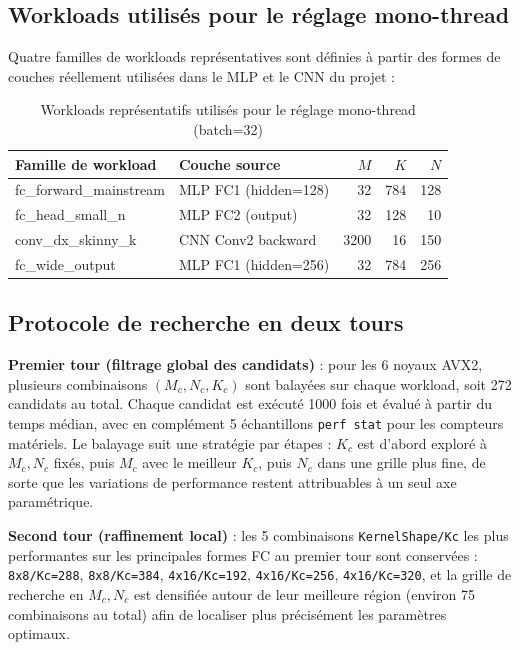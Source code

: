 \documentclass[a4paper,11pt,oneside]{article}
\begin{document}
\subsection{Workloads utilisés pour le réglage mono-thread}

Quatre familles de workloads représentatives sont définies à partir des formes de couches réellement utilisées dans le MLP et le CNN du projet :

\begin{table}[H]
\centering
\begin{tabular}{llrrr}
\toprule
\textbf{Famille de workload} & \textbf{Couche source} & $M$ & $K$ & $N$ \\
\midrule
fc\_forward\_mainstream & MLP FC1 (hidden=128) & 32 & 784 & 128 \\
fc\_head\_small\_n      & MLP FC2 (output)      & 32 & 128 & 10  \\
conv\_dx\_skinny\_k     & CNN Conv2 backward     & 3200 & 16 & 150 \\
fc\_wide\_output        & MLP FC1 (hidden=256)  & 32 & 784 & 256 \\
\bottomrule
\end{tabular}
\caption{Workloads représentatifs utilisés pour le réglage mono-thread (batch=32)}
\label{tab:tuning_workloads}
\end{table}

\subsection{Protocole de recherche en deux tours}

\textbf{Premier tour (filtrage global des candidats)} :
pour les 6 noyaux AVX2, plusieurs combinaisons $(M_c, N_c, K_c)$ sont balayées sur chaque workload, soit 272 candidats au total.
Chaque candidat est exécuté 1000 fois et évalué à partir du temps médian, avec en complément 5 échantillons \texttt{perf stat} pour les compteurs matériels.
Le balayage suit une stratégie par étapes : $K_c$ est d'abord exploré à $M_c, N_c$ fixés, puis $M_c$ avec le meilleur $K_c$, puis $N_c$ dans une grille plus fine,
de sorte que les variations de performance restent attribuables à un seul axe paramétrique.

\textbf{Second tour (raffinement local)} :
les 5 combinaisons \texttt{KernelShape/Kc} les plus performantes sur les principales formes FC au premier tour sont conservées :
\texttt{8x8/Kc=288}, \texttt{8x8/Kc=384}, \texttt{4x16/Kc=192},
\texttt{4x16/Kc=256}, \texttt{4x16/Kc=320},
et la grille de recherche en $M_c, N_c$ est densifiée autour de leur meilleure région (environ 75 combinaisons au total) afin de localiser plus précisément les paramètres optimaux.
\end{document}
